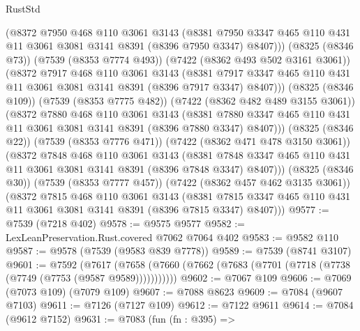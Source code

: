 \begin{lexlean}{RustStd}
\begin{coremodule}
              (@8372
                @7950
                @468
                @110
                @3061
                @3143
                (@8381
                  @7950
                  @3347
                  @465
                  @110
                  @431
                  @11
                  @3061
                  @3081
                  @3141
                  @8391
                  (@8396 @7950 @3347)
                  @8407)))
            (@8325 (@8346 @73))
            (@7539 (@8353 @7774 @493))
            (@7422 (@8362 @493 @502 @3161 @3061))
            (@8372
              @7917
              @468
              @110
              @3061
              @3143
              (@8381
                @7917
                @3347
                @465
                @110
                @431
                @11
                @3061
                @3081
                @3141
                @8391
                (@8396 @7917 @3347)
                @8407)))
          (@8325 (@8346 @109))
          (@7539 (@8353 @7775 @482))
          (@7422 (@8362 @482 @489 @3155 @3061))
          (@8372
            @7880
            @468
            @110
            @3061
            @3143
            (@8381
              @7880
              @3347
              @465
              @110
              @431
              @11
              @3061
              @3081
              @3141
              @8391
              (@8396 @7880 @3347)
              @8407)))
        (@8325 (@8346 @22))
        (@7539 (@8353 @7776 @471))
        (@7422 (@8362 @471 @478 @3150 @3061))
        (@8372
          @7848
          @468
          @110
          @3061
          @3143
          (@8381 @7848 @3347 @465 @110 @431 @11 @3061 @3081 @3141 @8391 (@8396 @7848 @3347) @8407)))
      (@8325 (@8346 @30))
      (@7539 (@8353 @7777 @457))
      (@7422 (@8362 @457 @462 @3135 @3061))
      (@8372
        @7815
        @468
        @110
        @3061
        @3143
        (@8381 @7815 @3347 @465 @110 @431 @11 @3061 @3081 @3141 @8391 (@8396 @7815 @3347) @8407)))
@9577 := @7539 (@7218 @402)
@9578 := @9575 @9577
@9582 := LexLeanPreservation.Rust.covered @7062 @7064 @402
@9583 := @9582 @110
@9587 := @9578 (@7539 (@9583 @839 @7778))
@9589 := @7539 (@8741 @3107)
@9601 := @7592
    (@7617 (@7658 (@7660 (@7662 (@7683 (@7701 (@7718 (@7738 (@7749 (@7753 (@9587 @9589)))))))))))
@9602 := @7067 @109
@9606 := @7069 (@7073 @109) (@7079 @109)
@9607 := @7088 @8623
@9609 := @7084 (@9607 @7103)
@9611 := @7126 (@7127 @109)
@9612 := @7122 @9611
@9614 := @7084 (@9612 @7152)
@9631 := @7083
    (fun (fn : @395) =>

\end{coremodule}
\end{lexlean}
